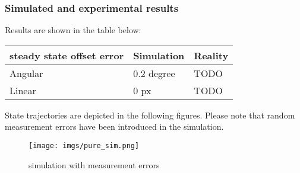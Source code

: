 {\color{PineGreen}\subsubsection{Simulated and experimental results}\label{subsubsec:pure_res}}
Results are shown in the table below:\\
\small
\noindent 
\begin{center}
    \begin{tabular}{ | p{5cm} | p{4cm} | p{4cm}|}
    \hline
    steady state offset error & Simulation & Reality \\ 
    \hline    
	Angular & 0.2 degree & TODO	\\
    \hline    
	Linear & 0 px & TODO \\
    \hline    
    \end{tabular}
\end{center}
State trajectories are depicted in the following figures. Please note that random measurement errors have been introduced in the simulation.
	\begin{figure}[H]
\begin{center}
	    \texttt{[image: imgs/pure\_sim.png]}
 		\caption{simulation with measurement errors}
 		\label{fig:system}
\end{center}
	\end{figure}
